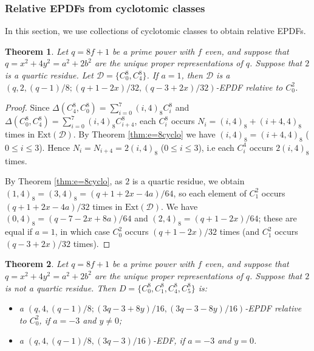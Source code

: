 \documentclass[12pt, a4paper]{article}
\newtheorem{theorem}{Theorem}[section]
\theoremstyle{definition}
\begin{document}
\subsubsection{Relative EPDFs from cyclotomic classes}
In this section, we use collections of cyclotomic classes to obtain relative EPDFs.



\begin{theorem}\label{thm:EPDF2QR}
Let $q=8f+1$ be a prime power with $f$ even, and suppose that
$q=x^2+4y^2=a^2+2b^2$ are the unique proper representations of $q$.  Suppose that $2$ is a quartic residue.
Let $\mathcal D=\{C_0^{8},C_4^{8}\}$.  If $a=1$, then $\mathcal D$ is a
	$(q,2, (q-1)/{8};(q+1-2x)/32,(q-3+2x)/32)$-EPDF
	relative to $C_0^2$.
\end{theorem}
\begin{proof}
Since $\Delta(C_4^8,C_0^8)=\sum_{i=0}^7 (i,4)_8 C_i^8$ and $\Delta(C_0^8,C_4^8)=\sum_{i=0}^7 (i,4)_8 C_{i+4}^8$, each $C_i^8$ occurs $N_i=(i,4)_8+(i+4,4)_8$ times in $\mathrm{Ext}(\mathcal{D})$.  By Theorem \ref{thm:e=8cyclo} we have $(i,4)_8=(i+4,4)_8$ ($0 \leq i \leq 3$).  Hence $N_i=N_{i+4}=2(i,4)_8$ ($0 \leq i \leq 3$), i.e each $C_i^4$ occurs $2(i,4)_8$ times.

By Theorem \ref{thm:e=8cyclo}, as $2$ is a quartic residue, we obtain 
$(1,4)_8=(3,4)_8=(q+1+2x-4a)/64$, so each element of $C_1^2$ occurs $(q+1+2x-4a)/32$ times in $\mathrm{Ext}(\mathcal{D})$. We have $(0,4)_8=(q-7-2x+8a)/64$ and $(2,4)_8=(q+1-2x)/64$; these are equal if $a=1$, in which case $C_0^2$ occurs $(q+1-2x)/32$ times (and $C_1^2$ occurs $(q-3+2x)/32$ times).
\end{proof}

\begin{theorem}\label{thm:EPDF1111}
	Let $q=8f+1$ be a prime power with $f$ even, and suppose that $q=x^2+4y^2=a^2+2b^2$ are the unique proper representations of $q$. Suppose that $2$ is not a
	quartic residue. Then
	$
	 D=\{C_0^8,C_1^8,C_4^8,C_5^8\}
	$ 
	is:
	\begin{itemize}
		\item a
		$
		(q,4,(q-1)/8;(3q-3+8y)/16,(3q-3-8y)/16)
		$-EPDF relative to $C_0^2$, if $a=-3$ and $y\ne0$;
		
		\item a
		$
		(q,4,(q-1)/8,(3q-3)/16)
		$-EDF, if $a=-3$ and $y=0$.
	\end{itemize}
\end{theorem}
\end{document}
